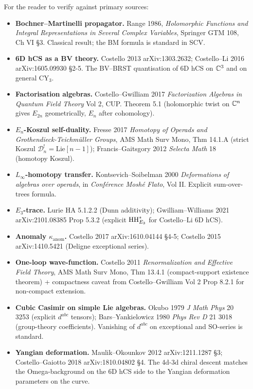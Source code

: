 For the reader to verify against primary sources:
\begin{itemize}
\item \textbf{Bochner--Martinelli propagator.} Range 1986,
\textit{Holomorphic Functions and Integral Representations in Several
Complex Variables}, Springer GTM 108, Ch VI §3. Classical result;
the BM formula is standard in SCV.
\item \textbf{6D hCS as a BV theory.} Costello 2013 arXiv:1303.2632;
Costello--Li 2016 arXiv:1605.09930 §2-5. The BV--BRST quantisation
of 6D hCS on $\mathbb{C}^3$ and on general CY$_3$.
\item \textbf{Factorisation algebras.} Costello--Gwilliam 2017
\textit{Factorization Algebras in Quantum Field Theory} Vol 2, CUP.
Theorem 5.1 (holomorphic twist on $\mathbb{C}^n$ gives $E_{2n}$
geometrically, $E_n$ after cohomology).
\item \textbf{$E_n$-Koszul self-duality.} Fresse 2017 \textit{Homotopy
of Operads and Grothendieck-Teichm\"uller Groups}, AMS Math Surv
Mono, Thm 14.1.A (strict Koszul $\mathcal D_n^! = \mathrm{Lie}[n-1]$);
Francis--Gaitsgory 2012 \textit{Selecta Math} 18 (homotopy Koszul).
\item \textbf{$L_\infty$-homotopy transfer.} Kontsevich--Soibelman
2000 \textit{Deformations of algebras over operads}, in
\textit{Conf\'erence Mosh\'e Flato}, Vol II. Explicit sum-over-trees
formula.
\item \textbf{$E_3$-trace.} Lurie HA 5.1.2.2 (Dunn additivity);
Gwilliam--Williams 2021 arXiv:2101.08385 Prop 5.3.2 (explicit
$\mathrm{HH}^*_{E_3}$ for Costello--Li 6D hCS).
\item \textbf{Anomaly $\kappa_{\mathrm{anom}}$.} Costello 2017
arXiv:1610.04144 §4-5; Costello 2015 arXiv:1410.5421 (Deligne
exceptional series).
\item \textbf{One-loop wave-function.} Costello 2011
\textit{Renormalization and Effective Field Theory}, AMS Math Surv
Mono, Thm 13.4.1 (compact-support existence theorem) + compactness
caveat from Costello--Gwilliam Vol 2 Prop 8.2.1 for non-compact
extension.
\item \textbf{Cubic Casimir on simple Lie algebras.} Okubo 1979
\textit{J Math Phys} 20 3253 (explicit $d^{abc}$ tensors);
Bars--Yankielowicz 1980 \textit{Phys Rev D} 21 3018 (group-theory
coefficients). Vanishing of $d^{abc}$ on exceptional and
$\mathrm{SO}$-series is standard.
\item \textbf{Yangian deformation.} Maulik--Okounkov 2012
arXiv:1211.1287 §3; Costello--Gaiotto 2018 arXiv:1810.04802 §4. The
4d-3d chiral descent matches the Omega-background on the 6D hCS
side to the Yangian deformation parameters on the curve.
\end{itemize}

